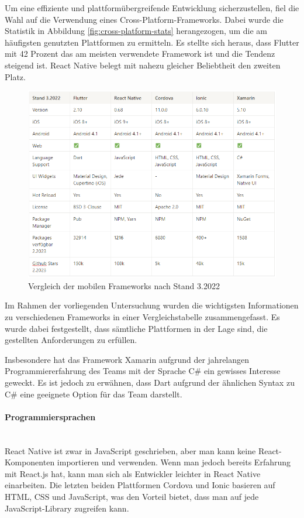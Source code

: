 Um eine effiziente und plattformübergreifende Entwicklung sicherzustellen, fiel die Wahl auf die Verwendung eines Cross-Platform-Frameworks. Dabei wurde die Statistik in Abbildung \ref{fig:cross-platform-stats} herangezogen, um die am häufigsten genutzten Plattformen zu ermitteln. Es stellte sich heraus, dass Flutter mit 42 Prozent das am meisten verwendete Framework ist und die Tendenz steigend ist. React Native belegt mit nahezu gleicher Beliebtheit den zweiten Platz.

\begin{figure}[h]
    \centering
    \includegraphics[width=1\textwidth]{pics/framework-comp.png}
    \caption{Vergleich der mobilen Frameworks nach Stand 3.2022 \cite{flutter, react-native, cordova, ionic, xamarin}}
    \label{fig:framework-comp}
\end{figure}

Im Rahmen der vorliegenden Untersuchung wurden die wichtigsten Informationen zu verschiedenen Frameworks in einer Vergleichstabelle zusammengefasst. Es wurde dabei festgestellt, dass sämtliche Plattformen in der Lage sind, die gestellten Anforderungen zu erfüllen.

Insbesondere hat das Framework Xamarin aufgrund der jahrelangen Programmiererfahrung des Teams mit der Sprache C\# ein gewisses Interesse geweckt. Es ist jedoch zu erwähnen, dass Dart aufgrund der ähnlichen Syntax zu C\# eine geeignete Option für das Team darstellt.

\paragraph{Programmiersprachen}\mbox{} \\
React Native ist zwar in JavaScript geschrieben, aber man kann keine React-Komponenten importieren und verwenden. Wenn man jedoch bereits Erfahrung mit React.js hat, kann man sich als Entwickler leichter in React Native einarbeiten. Die letzten beiden Plattformen Cordova und Ionic basieren auf HTML, CSS und JavaScript, was den Vorteil bietet, dass man auf jede JavaScript-Library zugreifen kann.



